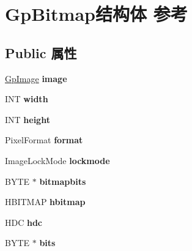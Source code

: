 \hypertarget{struct_gp_bitmap}{}\section{Gp\+Bitmap结构体 参考}
\label{struct_gp_bitmap}
\subsection*{Public 属性}
\begin{DoxyCompactItemize}
\item 
\mbox{\label{struct_gp_bitmap_a4c1d38616267b6cda1bf997de34ebdf9}} 
\hyperlink{struct_gp_image}{Gp\+Image} {\bfseries image}
\item 
\mbox{\label{struct_gp_bitmap_a3264cca73734eca39359097462f46930}} 
I\+NT {\bfseries width}
\item 
\mbox{\label{struct_gp_bitmap_a88c5a8aa4bd225ec205329fd001c010b}} 
I\+NT {\bfseries height}
\item 
\mbox{\label{struct_gp_bitmap_aa5f5cc9e78a36ab4d09d638bc0d04157}} 
Pixel\+Format {\bfseries format}
\item 
\mbox{\label{struct_gp_bitmap_a787abb00c32c443231a8d6d6087c9056}} 
Image\+Lock\+Mode {\bfseries lockmode}
\item 
\mbox{\label{struct_gp_bitmap_a9718b9842aabc71296db3e11512c952e}} 
B\+Y\+TE $\ast$ {\bfseries bitmapbits}
\item 
\mbox{\label{struct_gp_bitmap_af6749dd7e41afb606c66bc8e44f3f542}} 
H\+B\+I\+T\+M\+AP {\bfseries hbitmap}
\item 
\mbox{\label{struct_gp_bitmap_adf6acc30881e473f7dd1f8e574c7fd98}} 
H\+DC {\bfseries hdc}
\item 
\mbox{\label{struct_gp_bitmap_a62fea1cfadcd27f0706ec5849c822f26}} 
B\+Y\+TE $\ast$ {\bfseries bits}
\item 
\mbox{\label{struct_gp_bitmap_af3582cbcf720ac971a15dcfd1e87f847}} 

\end{DoxyCompactItemize}
